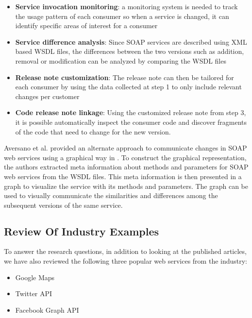 \documentclass[runningheads,a4paper]{llncs}
\begin{document}
\begin{itemize}
  \item \textbf{Service invocation monitoring}: a monitoring system is needed to track the usage pattern of each consumer so when a service is changed, it can identify specific areas of interest for a consumer
  \item \textbf{Service difference analysis}: Since SOAP services are described using XML based WSDL files, the differences between the two versions such as addition, removal or modification can be analyzed by comparing the WSDL files
  \item \textbf{Release note customization}: The release note can then be tailored for each consumer by using the data collected at step 1 to only include relevant changes per customer
  \item \textbf{Code release note linkage}: Using the customized release note from step 3, it is possible automatically inspect the consumer code and discover fragments of the code that need to change for the new version.
\end{itemize}

Aversano et al. provided an alternate approach to communicate changes in SOAP web services using a graphical way in \cite{aversano2005visualizing}. To construct the graphical representation, the authors extracted meta information about methods and parameters for SOAP web services from the WSDL files. This meta information is then presented in a graph to visualize the service with its methods and parameters. The graph can be used to visually communicate the similarities and differences among the subsequent versions of the same service.



\subsection{Review Of Industry Examples} %
\label{sub:review_of_industry_examples}

To answer the research questions, in addition to looking at the published articles, we have also reviewed the following three popular web services from the industry:

\begin{itemize}
  \item Google Maps
  \item Twitter API
  \item Facebook Graph API
\end{itemize}
\end{document}
